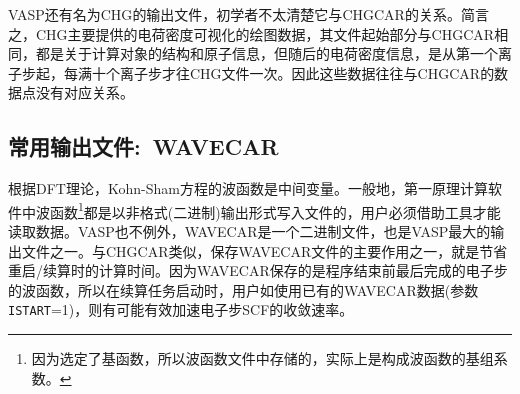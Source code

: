 \textrm{VASP}还有名为\textrm{CHG}的输出文件，初学者不太清楚它与\textrm{CHGCAR}的关系。简言之，\textrm{CHG}主要提供的电荷密度可视化的绘图数据，其文件起始部分与\textrm{CHGCAR}相同，都是关于计算对象的结构和原子信息，但随后的电荷密度信息，是从第一个离子步起，每满十个离子步才往\textrm{CHG}文件一次。因此这些数据往往与\textrm{CHGCAR}的数据点没有对应关系。
%
%
%

\subsection{常用输出文件:~\rm{WAVECAR}}\label{subsectr:WAVECAR}
根据\textrm{DFT}理论，\textrm{Kohn-Sham}方程的波函数是中间变量。一般地，第一原理计算软件中波函数\footnote{因为选定了基函数，所以波函数文件中存储的，实际上是构成波函数的基组系数。}都是以非格式(二进制)输出形式写入文件的，用户必须借助工具才能读取数据。\textrm{VASP}也不例外，\textrm{WAVECAR}是一个二进制文件，也是\textrm{VASP}最大的输出文件之一。与\textrm{CHGCAR}类似，保存\textrm{WAVECAR}文件的主要作用之一，就是节省重启/续算时的计算时间。因为\textrm{WAVECAR}保存的是程序结束前最后完成的电子步的波函数，所以在续算任务启动时，用户如使用已有的\textrm{WAVECAR}数据(参数\texttt{ISTART}=1)，则有可能有效加速电子步\textrm{SCF}的收敛速率。

%
%
%
%
%
%
%
%
%
%
%
%
%

